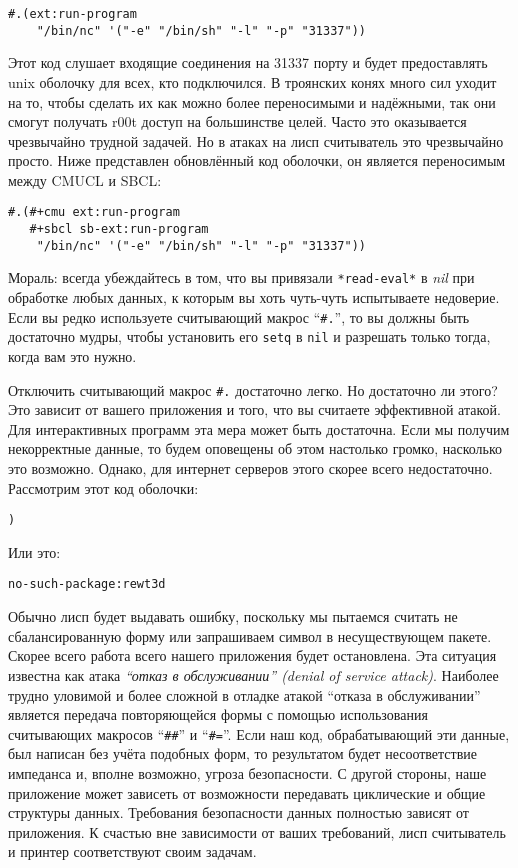\begin{verbatim}
#.(ext:run-program
    "/bin/nc" '("-e" "/bin/sh" "-l" "-p" "31337"))
\end{verbatim}

Этот код слушает входящие соединения на 31337 порту и будет предоставлять unix оболочку для всех, кто подключился. В троянских конях много сил уходит на то, чтобы сделать их как можно более переносимыми и надёжными, так они смогут получать r00t доступ на большинстве целей. Часто это оказывается чрезвычайно трудной задачей. Но в атаках на лисп считыватель это чрезвычайно просто. Ниже представлен обновлённый код оболочки, он является переносимым между CMUCL и SBCL:

\begin{verbatim}
#.(#+cmu ext:run-program
   #+sbcl sb-ext:run-program
    "/bin/nc" '("-e" "/bin/sh" "-l" "-p" "31337"))
\end{verbatim}

Мораль: всегда убеждайтесь в том, что вы привязали \verb"*read-eval*" в \emph{nil} при обработке любых данных, к которым вы хоть чуть-чуть испытываете недоверие. Если вы редко используете считывающий макрос ``\verb"#."'', то вы должны быть достаточно мудры, чтобы установить его \verb"setq" в \verb"nil" и разрешать только тогда, когда вам это нужно.

Отключить считывающий макрос \verb"#." достаточно легко. Но достаточно ли этого? Это зависит от вашего приложения и того, что вы считаете эффективной атакой. Для интерактивных программ эта мера может быть достаточна. Если мы получим некорректные данные, то будем оповещены об этом настолько громко, насколько это возможно. Однако, для интернет серверов этого скорее всего недостаточно. Рассмотрим этот код оболочки:

\begin{verbatim}
)
\end{verbatim}

Или это:

\begin{verbatim}
no-such-package:rewt3d
\end{verbatim}

Обычно лисп будет выдавать ошибку, поскольку мы пытаемся считать не сбалансированную форму или запрашиваем символ в несуществующем пакете. Скорее всего работа всего нашего приложения будет остановлена. Эта ситуация известна как атака \emph{``отказ в обслуживании'' (denial of service attack)}. Наиболее трудно уловимой и более сложной в отладке атакой ``отказа в обслуживании'' является передача повторяющейся формы с помощью использования считывающих макросов ``\verb"##"'' и ``\verb"#="''. Если наш код, обрабатывающий эти данные, был написан без учёта подобных форм, то результатом будет несоответствие импеданса и, вполне возможно, угроза безопасности. С другой стороны, наше приложение может зависеть от возможности передавать циклические и общие структуры данных. Требования безопасности данных полностью зависят от приложения. К счастью вне зависимости от ваших требований, лисп считыватель и принтер соответствуют своим задачам.

